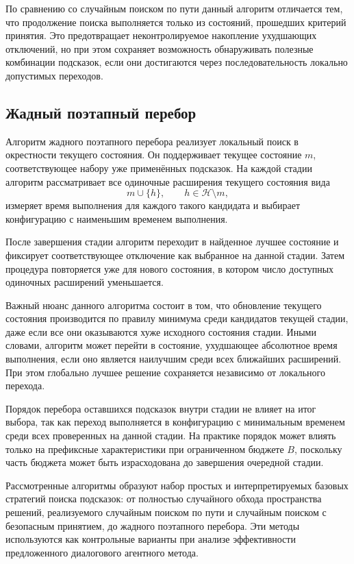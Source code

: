 По сравнению со случайным поиском по пути данный алгоритм отличается тем, что продолжение поиска выполняется только из состояний, прошедших критерий принятия. Это предотвращает неконтролируемое накопление ухудшающих отключений, но при этом сохраняет возможность обнаруживать полезные комбинации подсказок, если они достигаются через последовательность локально допустимых переходов.

\subsection{Жадный поэтапный перебор}\label{subsec:ch4_greedystage}

Алгоритм жадного поэтапного перебора реализует локальный поиск в окрестности текущего состояния. Он поддерживает текущее состояние \(m\), соответствующее набору уже применённых подсказок. На каждой стадии алгоритм рассматривает все одиночные расширения текущего состояния вида
\begin{equation}
m \cup \{h\}, \qquad h \in \mathcal{H}\setminus m,
\end{equation}
измеряет время выполнения для каждого такого кандидата и выбирает конфигурацию с наименьшим временем выполнения.

После завершения стадии алгоритм переходит в найденное лучшее состояние и фиксирует соответствующее отключение как выбранное на данной стадии. Затем процедура повторяется уже для нового состояния, в котором число доступных одиночных расширений уменьшается.

Важный нюанс данного алгоритма состоит в том, что обновление текущего состояния производится по правилу минимума среди кандидатов текущей стадии, даже если все они оказываются хуже исходного состояния стадии. Иными словами, алгоритм может перейти в состояние, ухудшающее абсолютное время выполнения, если оно является наилучшим среди всех ближайших расширений. При этом глобально лучшее решение сохраняется независимо от локального перехода.

Порядок перебора оставшихся подсказок внутри стадии не влияет на итог выбора, так как переход выполняется в конфигурацию с минимальным временем среди всех проверенных на данной стадии. На практике порядок может влиять только на префиксные характеристики при ограниченном бюджете \(B\), поскольку часть бюджета может быть израсходована до завершения очередной стадии.

Рассмотренные алгоритмы образуют набор простых и интерпретируемых базовых стратегий поиска подсказок: от полностью случайного обхода пространства решений, реализуемого случайным поиском по пути и случайным поиском с безопасным принятием, до жадного поэтапного перебора. Эти методы используются как контрольные варианты при анализе эффективности предложенного диалогового агентного метода.

